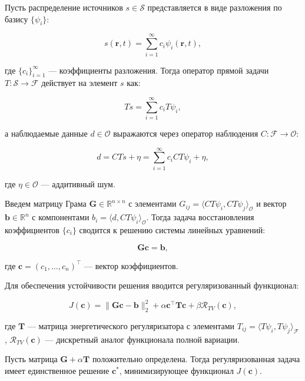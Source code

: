 \documentclass[a4paper,14pt,oneside,openany]{extarticle}
\begin{document}
Пусть распределение источников $s \in \mathcal{S}$ представляется в виде разложения по базису $\{\psi_i\}$:

\begin{equation}
    s(\mathbf{r}, t) = \sum_{i=1}^\infty c_i \psi_i(\mathbf{r}, t),
\end{equation}

где $\{c_i\}_{i=1}^\infty$ --- коэффициенты разложения. Тогда оператор прямой задачи $T: \mathcal{S} \to \mathcal{F}$ действует на элемент $s$ как:

\begin{equation}
    Ts = \sum_{i=1}^\infty c_i T\psi_i,
\end{equation}

а наблюдаемые данные $d \in \mathcal{O}$ выражаются через оператор наблюдения $C: \mathcal{F} \to \mathcal{O}$:

\begin{equation}
    d = C Ts + \eta = \sum_{i=1}^\infty c_i C T \psi_i + \eta,
\end{equation}

где $\eta \in \mathcal{O}$ --- аддитивный шум.

Введем матрицу Грама $\mathbf{G} \in \mathbb{R}^{n \times n}$ с элементами $G_{ij} = \langle C T \psi_i, C T \psi_j \rangle_{\mathcal{O}}$ 
и вектор $\mathbf{b} \in \mathbb{R}^n$ с компонентами $b_i = \langle d, C T \psi_i \rangle_{\mathcal{O}}$. Тогда задача восстановления 
коэффициентов $\{c_i\}$ сводится к решению системы линейных уравнений:

\begin{equation}
    \mathbf{G} \mathbf{c} = \mathbf{b},
\end{equation}

где $\mathbf{c} = (c_1, \dots, c_n)^\top$ --- вектор коэффициентов.

Для обеспечения устойчивости решения вводится регуляризованный функционал:

\begin{equation}
    J(\mathbf{c}) = \|\mathbf{G} \mathbf{c} - \mathbf{b}\|_2^2 + \alpha \mathbf{c}^\top \mathbf{T} \mathbf{c} + \beta \mathcal{R}_{TV}(\mathbf{c}),
\end{equation}

где $\mathbf{T}$ --- матрица энергетического регуляризатора с элементами $T_{ij} = 
\langle T \psi_i, T \psi_j \rangle_{\mathcal{F}}$, $\mathcal{R}_{TV}(\mathbf{c})$ --- дискретный аналог функционала полной вариации.

\begin{theorem}
Пусть матрица $\mathbf{G} + \alpha \mathbf{T}$ положительно определена. Тогда регуляризованная задача 
имеет единственное решение $\mathbf{c}^*$, минимизирующее функционал $J(\mathbf{c})$.
\end{theorem}
\end{document}
